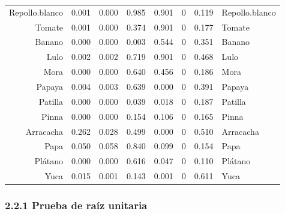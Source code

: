 \documentclass[11pt]{article}
\begin{document}
\begin{tabular}{r|lllllll}
	Repollo.blanco & 0.001            & 0.000            & 0.985            & 0.901            & 0                & 0.119            & Repollo.blanco  \\
	Tomate & 0.001            & 0.000            & 0.374            & 0.901            & 0                & 0.177            & Tomate          \\
	Banano & 0.000            & 0.000            & 0.003            & 0.544            & 0                & 0.351            & Banano          \\
	Lulo & 0.002            & 0.002            & 0.719            & 0.901            & 0                & 0.468            & Lulo            \\
	Mora & 0.000            & 0.000            & 0.640            & 0.456            & 0                & 0.186            & Mora            \\
	Papaya & 0.004            & 0.003            & 0.639            & 0.000            & 0                & 0.391            & Papaya          \\
	Patilla & 0.000            & 0.000            & 0.039            & 0.018            & 0                & 0.187            & Patilla         \\
	Pinna & 0.000            & 0.000            & 0.154            & 0.106            & 0                & 0.165            & Pinna           \\
	Arracacha & 0.262            & 0.028            & 0.499            & 0.000            & 0                & 0.510            & Arracacha       \\
	Papa & 0.050            & 0.058            & 0.840            & 0.099            & 0                & 0.154            & Papa            \\
	Plátano & 0.000            & 0.000            & 0.616            & 0.047            & 0                & 0.110            & Plátano         \\
	Yuca & 0.015            & 0.001            & 0.143            & 0.001            & 0                & 0.611            & Yuca            \\
\end{tabular}


    
    \hypertarget{prueba-de-rauxedz-unitaria}{%
\subsubsection{2.2.1 Prueba de raíz
unitaria}\label{prueba-de-rauxedz-unitaria}}
\end{document}
